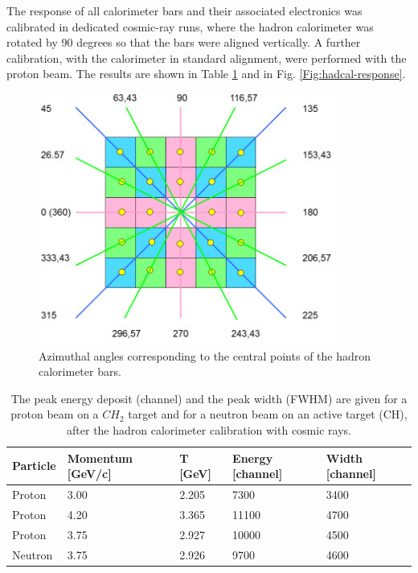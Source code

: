 \documentclass[twocolumn,epjc3]{svjour3}
\begin{document}
The response of all calorimeter bars and their associated electronics was calibrated in dedicated cosmic-ray runs, where the hadron calorimeter was rotated by 90 degrees so that the bars were aligned vertically. A further calibration, with the calorimeter in standard alignment, were performed with the proton beam.  The results are shown in Table \ref{Tab:hadro} and in Fig. \ref{Fig:hadcal-response}.

\begin{figure}
  \centering
  \includegraphics[width=1.00\columnwidth]{fig11_Fig11.jpg}
  \caption{Azimuthal angles corresponding to the central points of the hadron calorimeter bars.}
  \label{fig:HadCalAng}
\end{figure}

\begin{table}
  \centering
  \caption{The peak energy deposit (channel) and the peak width (FWHM) are given for a proton beam on a $CH_2$ target and for a neutron beam on an active target (CH), after the hadron calorimeter calibration with cosmic rays.}
  \label{Tab:hadro}
  \begin{tabular*}{\textwidth}{@{\extracolsep{\fill}} lllll @{}}
    \hline
    Particle & Momentum [GeV/c] & T [GeV] & Energy [channel] & Width [channel] \\
    \hline
    Proton  & 3.00 & 2.205 & 7300  & 3400 \\
    Proton  & 4.20 & 3.365 & 11100 & 4700 \\
    Proton  & 3.75 & 2.927 & 10000 & 4500 \\
    Neutron & 3.75 & 2.926 & 9700  & 4600 \\
    \hline
  \end{tabular*}
\end{table}
\end{document}
